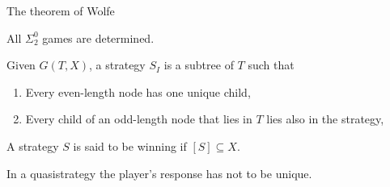 \documentclass{beamer} %
\begin{document}
\begin{frame}{The theorem of Wolfe}
    \begin{theorem}
        All $\Sigma^0_2$ games are determined.\label{Sigma2Det}
    \end{theorem}
\end{frame}


\begin{frame}
    \begin{definition}
        Given $G(T, X)$, a strategy $S_{I}$ is a subtree of $T$ such that \begin{enumerate}
            \item<2-> Every even-length node has one unique child,
            \item<3-> Every child of an odd-length node that lies in $T$ lies also in the strategy,
        \end{enumerate}
        \pause
        \pause
        \pause
        A strategy $S$ is said to be winning if $[S] \subseteq X$.
    \end{definition}
    \pause 
    In a quasistrategy the player's response has not to be unique.
\end{frame}

\end{document}
